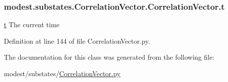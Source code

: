 \subsubsection[{\texorpdfstring{t}{t}}]{\setlength{\rightskip}{0pt plus 5cm}modest.\+substates.\+Correlation\+Vector.\+Correlation\+Vector.\+t}\hypertarget{classmodest_1_1substates_1_1CorrelationVector_1_1CorrelationVector_a1d1ff5015d8fb50190cb840ec9ea1409}{}\label{classmodest_1_1substates_1_1CorrelationVector_1_1CorrelationVector_a1d1ff5015d8fb50190cb840ec9ea1409}


\hyperlink{classmodest_1_1substates_1_1CorrelationVector_1_1CorrelationVector_a1d1ff5015d8fb50190cb840ec9ea1409}{t} The current time 



Definition at line 144 of file Correlation\+Vector.\+py.



The documentation for this class was generated from the following file\+:\begin{DoxyCompactItemize}
\item 
modest/substates/\hyperlink{CorrelationVector_8py}{Correlation\+Vector.\+py}\end{DoxyCompactItemize}
